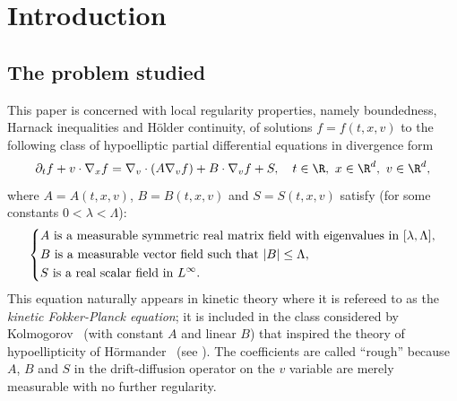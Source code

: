\section{Introduction}

\label{sec:intro}

\subsection{The problem studied}
\label{sec:theequation}

This paper is concerned with local regularity properties, namely
boundedness, Harnack inequalities and Hölder continuity, of
solutions $f=f(t,x,v)$ to the following class of hypoelliptic
partial differential equations in divergence form
\begin{equation}
\label{e:main}
\partial_t f + v \cdot \nabla_x f = \nabla_v \cdot (
A \nabla_v f) + B \cdot \nabla_v f + S,
\quad t \in \R, \ x \in \R^d, \ v \in \R^d,
\end{equation}
where $A=A(t,x,v)$, $B=B(t,x,v)$ and $S=S(t,x,v)$ satisfy (for some
constants $0 < \lambda < \Lambda$):
\begin{equation}
\label{e:hyp-coef}
\begin{dcases}
\text{$A$ is a measurable symmetric real matrix field with
eigenvalues in } [\lambda,\Lambda],\\
\text{$B$ is a measurable vector field such that }
|B| \le \Lambda,\\
\text{$S$ is a real scalar field in $L^\infty$.}
\end{dcases}
\end{equation}
This equation naturally appears in kinetic theory where it is
refereed to as the \emph{kinetic Fokker-Planck equation}; it is
included in the class considered by Kolmogorov~\cite{kolmogorov}
(with constant $A$ and linear $B$) that inspired the theory of
hypoellipticity of Hörmander~\cite{MR0222474} (see
\cite{AP20}). The coefficients are called ``rough'' because $A$,
$B$ and $S$ in the drift-diffusion operator on the $v$ variable
are merely measurable with no further regularity.

